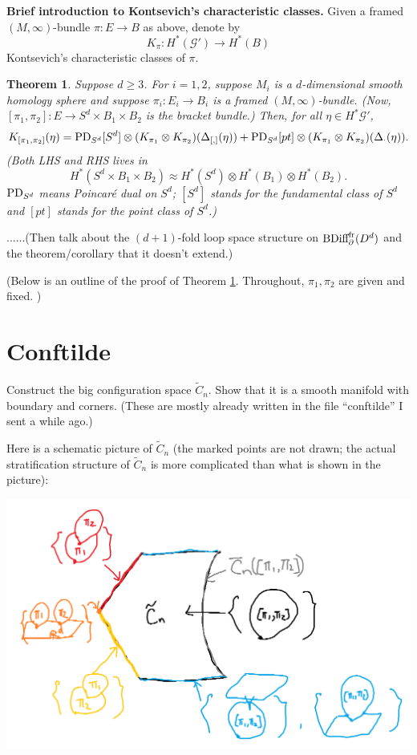 \documentclass[11pt]{article}
\newtheorem{thm}{Theorem}[section]
\theoremstyle{definition}
\theoremstyle{remark}
\def\wt#1{\widetilde{#1}}
\def\cG{\mathcal{G}}
\def\tn#1{\textnormal{#1}}
\begin{document}
{\bf Brief introduction to Kontsevich's characteristic classes.}
Given a framed $(M,\infty)$-bundle $\pi:E\to B$ as above, denote by  
$$K_\pi: H^*(\cG')\longrightarrow H^*(B)$$
Kontsevich's characteristic classes of $\pi$. 


\begin{thm}\label{formula_thm}
Suppose $d\ge3$. 
For $i=1,2$, suppose $M_i$ is a $d$-dimensional smooth homology sphere and 
suppose $\pi_i: E_i\to B_i$ is a framed $(M,\infty)$-bundle. 
(Now, $[\pi_1,\pi_2]: E\to S^d\times B_1\times B_2$ is the bracket bundle.)
Then, for all $\eta\in H^*\cG'$, 
\begin{align*}
K_{[\pi_1,\pi_2]}(\eta)=
\tn{PD}_{S^d}[S^d]\otimes
(K_{\pi_1}\otimes K_{\pi_2})(\Delta_{[,]}(\eta))
+\tn{PD}_{S^d}[pt]\otimes
(K_{\pi_1}\otimes K_{\pi_2})(\Delta_\cdot(\eta)).
\end{align*}
(Both LHS and RHS lives in 
$$H^*(S^d\times B_1\times B_2)\approx H^*(S^d)\otimes H^*(B_1)\otimes H^*(B_2).$$
$\tn{PD}_{S^d}$ means Poincar\'e dual on $S^d$; $[S^d]$ stands for the fundamental class of $S^d$ and $[pt]$ stands for the point class of $S^d$.)
\end{thm}


......(Then talk about the $(d+1)$-fold loop space structure on $\tn{BDiff}^{\tn{fr}}_\partial(D^d)$ and the theorem/corollary that it doesn't extend.)

(Below is an outline of the proof of Theorem \ref{formula_thm}.
Throughout, $\pi_1,\pi_2$ are given and fixed. 
)

\section{Conftilde}\label{conftilde_sec}

Construct the big configuration space $\widetilde{C}_n$. 
Show that it is a smooth manifold with boundary and corners. 
(These are mostly already written in the file ``conftilde'' I sent a while ago.)

Here is a schematic picture of $\wt{C}_n$ (the marked points are not drawn; the actual stratification structure of $\wt{C}_n$ is more complicated than what is shown in the picture): 

\includegraphics[scale=0.7]{conftilde.png}
\end{document}

